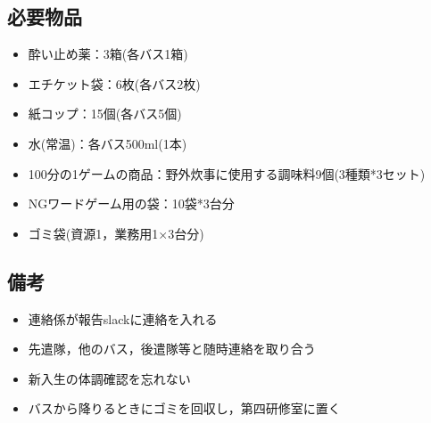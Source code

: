 \subsection{必要物品}
\begin{itemize}
\item 酔い止め薬：3箱(各バス1箱)
\item エチケット袋：6枚(各バス2枚)
\item 紙コップ：15個(各バス5個)
\item 水(常温)：各バス500ml(1本)
\item 100分の1ゲームの商品：野外炊事に使用する調味料9個(3種類*3セット)
\item NGワードゲーム用の袋：10袋*3台分
\item ゴミ袋(資源1，業務用1×3台分)
\end{itemize}

\subsection{備考}

\begin{itemize}
\item 連絡係が報告slackに連絡を入れる
\item 先遣隊，他のバス，後遣隊等と随時連絡を取り合う
\item 新入生の体調確認を忘れない
\item バスから降りるときにゴミを回収し，第四研修室に置く \\
\end{itemize}


